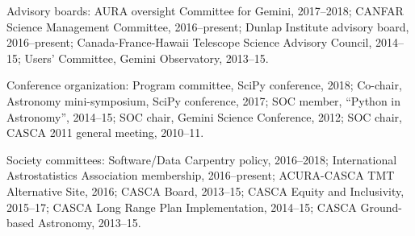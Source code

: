 Advisory boards:
AURA oversight Committee for Gemini, 2017--2018;
CANFAR Science Management Committee, 2016--present;
Dunlap Institute advisory board, 2016--present;
Canada-France-Hawaii Telescope Science Advisory Council, 2014--15;
Users' Committee, Gemini Observatory, 2013--15.
\vspace{0.2cm}

Conference organization: 
Program committee, SciPy conference, 2018;
Co-chair, Astronomy mini-symposium, SciPy conference, 2017;
SOC member, ``Python in Astronomy'', 2014--15;
SOC chair, Gemini Science Conference, 2012;
SOC chair, CASCA 2011 general meeting, 2010--11.
\vspace{0.2cm} 

Society committees:
Software/Data Carpentry policy, 2016--2018;
International Astrostatistics Association membership, 2016--present;
ACURA-CASCA TMT Alternative Site, 2016;
CASCA Board, 2013--15;
CASCA Equity and Inclusivity, 2015--17;
CASCA Long Range Plan Implementation, 2014--15;
CASCA Ground-based Astronomy, 2013--15.